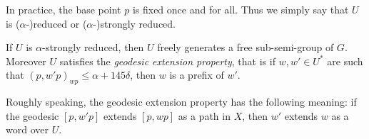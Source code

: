 In practice, the base point $p$ is fixed once and for all.
Thus we simply say that $U$ is ($\alpha$-)reduced or ($\alpha$-)strongly reduced.

\begin{lem}
\label{res: free-sub-semigroup}
If $U$ is $\alpha$-strongly reduced, then $U$ freely generates a free sub-semi-group of $G$.
Moreover $U$ satisfies the \emph{geodesic extension property}, that is if $w, w' \in U^*$ are such that $(p, w'p)_{wp} \leq \alpha +145\delta$, then $w$ is a prefix of $w'$.
\end{lem}

\begin{rem}
Roughly speaking, the geodesic extension property has the following meaning: if the geodesic $[p, w'p]$ extends $[p, wp]$ as a path in $X$, then $w'$ extends $w$ as a word over $U$.
\end{rem}

